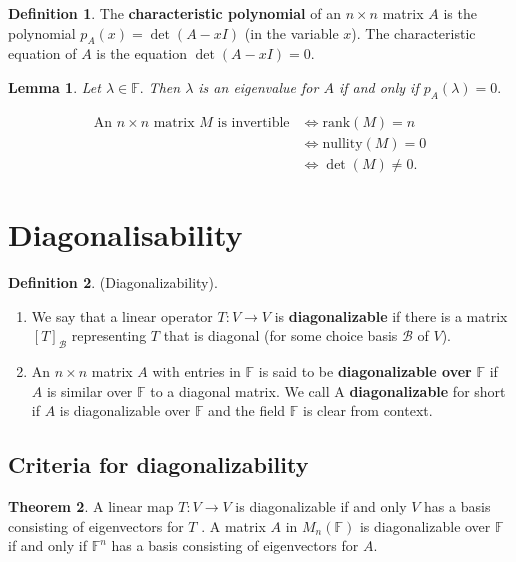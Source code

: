 \documentclass[12pt, a4paper]{article}
\newcommand{\bb}[1]{\mathbb{#1}}
\newcommand{\Cal}[1]{\mathcal{#1}}
\theoremstyle{definition}
\newtheorem{definition}{Definition}[section]
\newtheorem{theorem}{Theorem}[section]
\theoremstyle{plain}
\newtheorem{lemma}[theorem]{Lemma}
\begin{document}
\begin{definition}
The \textbf{characteristic polynomial} of an $n \times n$ matrix $A$ is the polynomial $p_A(x) = \det(A - xI)$ (in the variable $x$). The characteristic equation of $A$ is the equation $\det(A - xI) = 0.$
\end{definition}

\begin{lemma}
Let $\lambda \in \bb{F}.$ Then $\lambda$ is an eigenvalue for $A$ if and only if $p_A(\lambda) = 0.$
\end{lemma}

\begin{tcolorbox}
$$\begin{aligned}
\text{An $n \times n$ matrix $M$ is invertible} &\iff \text{rank$(M)=n$} \\
&\iff \text{nullity$(M)=0$} \\
&\iff \det(M)\neq 0.
\end{aligned}$$
\end{tcolorbox}

\section{Diagonalisability}

\begin{definition}
(Diagonalizability).

\begin{enumerate}
	
	\item We say that a linear operator $T : V \rightarrow V$ is \textbf{diagonalizable} if there is a matrix $[T]_{\Cal{B}}$ representing $T$ that is diagonal (for some choice basis $\Cal{B}$ of $V$).

	\item An $n \times n$ matrix $A$ with entries in $\bb{F}$ is said to be \textbf{diagonalizable over} $\bb{F}$ if $A$ is similar over $\bb{F}$ to a diagonal matrix. We call A \textbf{diagonalizable} for short if $A$ is diagonalizable over $\bb{F}$ and the field $\bb{F}$ is clear from context.

\end{enumerate}
\end{definition}

\subsection{Criteria for diagonalizability}

\begin{theorem}
A linear map $T : V \to V$ is diagonalizable if and only $V$ has a basis consisting of eigenvectors for $T$ . A matrix $A$ in $M_n(\bb{F})$ is diagonalizable over $\bb{F}$ if and only if $\bb{F}^n$ has a basis consisting of eigenvectors for $A.$
\end{theorem}
\end{document}

